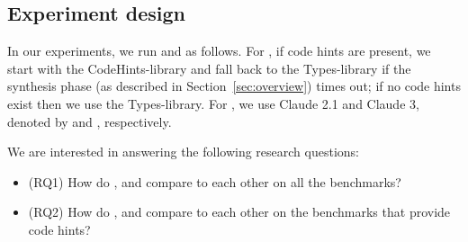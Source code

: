 \documentclass[sigconf,review,anonymous]{acmart}
\begin{document}
\subsection{Experiment design}

In our experiments, we run \tool and \llm as follows. For \tool, if code hints are present, we start with the CodeHints-library and fall back to the Types-library if the synthesis phase (as described in Section~\ref{sec:overview}) times out; if no code hints exist then we use the Types-library. For \llm, we use Claude 2.1 and Claude 3, denoted by \llma and \llmb, respectively.


We are interested in answering the following research questions:
\begin{itemize}
\item (RQ1) How do \tool, \llma and \llmb compare to each other on all the benchmarks?

\item (RQ2) How do \tool, \llma and \llmb compare to each other on the benchmarks that provide code hints?  


\end{itemize}
  
%
\end{document}
